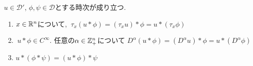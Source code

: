 \begin{tcolorbox}[mybox]
\begin{thm}\cite[Theorem 6.30]{Rud}
\label{thm-H-2.10}
 \(u \in \mathcal{D}'\), \(\phi, \psi \in \mathcal{D}\)とする時次が成り立つ. 
\begin{enumerate}[label=$(\alph*)$]
\item $x \in \mathbb{R}^n$について,  \(\ \tau_x(u \ast \phi) = (\tau_x u) \ast \phi = u \ast (\tau_x \phi)\)
\item  \(\ u \ast \phi \in C^\infty\). 任意の$\alpha \in \mathbb{Z}_+^n$について 
\(D^\alpha (u \ast \phi) = (D^\alpha u) \ast \phi = u \ast (D^\alpha \phi) \) 
\item \( u \ast (\phi \ast \psi) = (u \ast \phi) \ast \psi \) 
\end{enumerate}
\end{thm}
\end{tcolorbox}

